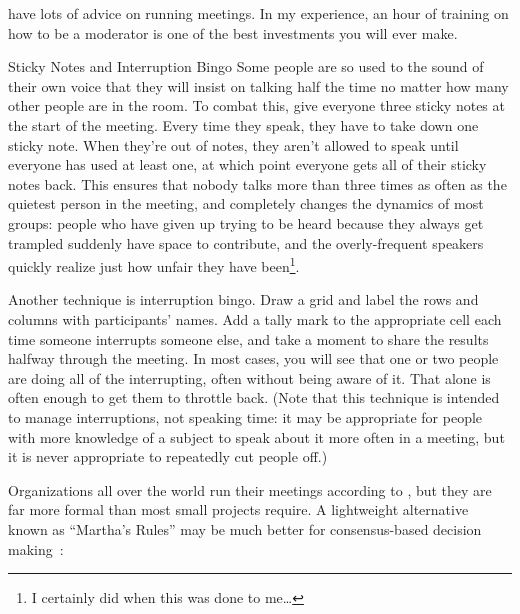 \begin{descripción}
\begin{description}
\end{description}

\cite{Brow2007,Broo2016,Roge2018} have lots of advice on running meetings.
In my experience,
an hour of training on how to be a moderator
is one of the best investments you will ever make.

\begin{aside}{Sticky Notes and Interruption Bingo}
  Some people are so used to the sound of their own voice
  that they will insist on talking half the time
  no matter how many other people are in the room.
  To combat this,
  give everyone three sticky notes at the start of the meeting.
  Every time they speak,
  they have to take down one sticky note.
  When they're out of notes,
  they aren't allowed to speak until everyone has used at least one,
  at which point everyone gets all of their sticky notes back.
  This ensures that nobody talks more than three times as often as
  the quietest person in the meeting,
  and completely changes the dynamics of most groups:
  people who have given up trying to be heard because they always get trampled
  suddenly have space to contribute,
  and the overly-frequent speakers quickly realize just how unfair they have been\footnote{
    I certainly did when this was done to me{\ldots}
  }.

  Another technique is interruption bingo.
  Draw a grid and label the rows and columns with participants' names.
  Add a tally mark to the appropriate cell
  each time someone interrupts someone else,
  and take a moment to share the results halfway through the meeting.
  In most cases,
  you will see that one or two people are doing all of the interrupting,
  often without being aware of it.
  That alone is often enough to get them to throttle back.
  (Note that this technique is intended to manage interruptions,
  not speaking time:
  it may be appropriate for people with more knowledge of a subject
  to speak about it more often in a meeting,
  but it is never appropriate to repeatedly cut people off.)
\end{aside}


Organizations all over the world run their meetings according to
,
but they are far more formal than most small projects require.
A lightweight alternative known as ``Martha's Rules''
may be much better for consensus-based decision making~\cite{Mina1986}:


\end{descripción}
